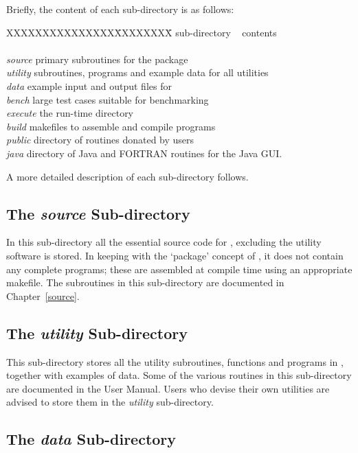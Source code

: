Briefly, the content of each sub-directory is as follows:
\begin{tabbing}
XXXXXXXXXXXXXXX\= XXXXXXXX\= \kill
sub-directory\> ~ \> contents \\
\> ~ \> \\
{\em source} \> primary subroutines for the \D package \\
{\em utility} \> subroutines, programs and example data for all utilities \\
{\em data} \> example input and output files for \D \\
{\em bench} \> large test cases suitable for benchmarking \\
{\em execute} \> the \D run-time directory \\
{\em build} \> makefiles to assemble and compile \D programs \\
{\em public} \> directory of routines donated by \D users \\
{\em java} \> directory of Java and FORTRAN routines for the Java GUI. \\
\end{tabbing}

\noindent A more detailed description of each sub-directory
follows.

\subsection{The {\em source} Sub-directory}

In this sub-directory all the essential source code for \D,
excluding the utility software is stored.  In keeping with the
`package' concept of \D, it does not contain any complete
programs; these are assembled at compile time using an appropriate
makefile.  The subroutines in this sub-directory are documented in
Chapter~\ref{source}.

\subsection{The {\em utility} Sub-directory}

This sub-directory stores all the utility subroutines, functions and
programs in \D, together with examples of data.  Some of the various
routines in this sub-directory are documented in the \C
User Manual.  Users who devise their own utilities are advised
to store them in the {\em utility} sub-directory.

\subsection{The {\em data} Sub-directory}

